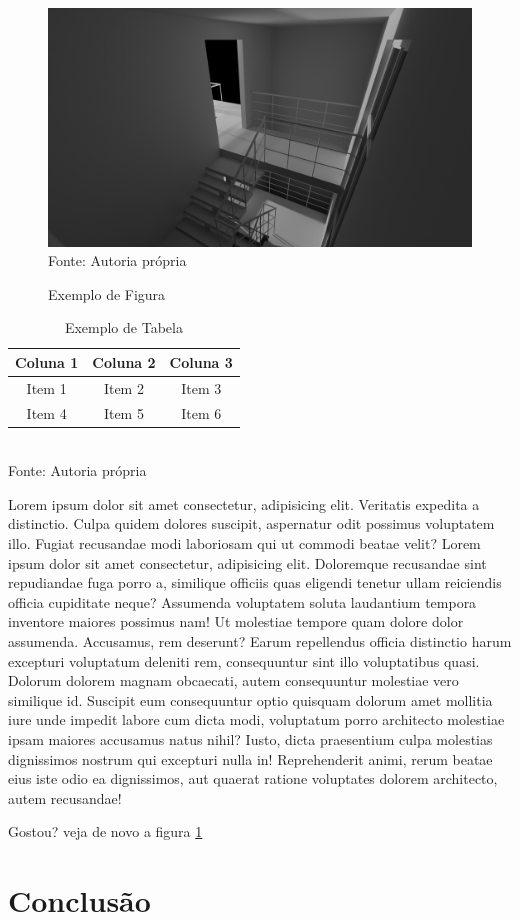 \documentclass[12pt,a4paper,oneside,brazil]{abntex2}
\begin{document}
\begin{figure}[ht]
    \centering
    \caption{Exemplo de Figura}
    \includegraphics[width=1.0\textwidth]{./src/assets/untitled.png}
    \label{fig:exemplo}
    \textnormal{\fontsize{10pt}{12pt}Fonte: Autoria própria}
\end{figure}

\begin{table}[ht]
    \centering
    \caption{Exemplo de Tabela}
    \begin{tabular}{|c|c|c|}
        \hline
        Coluna 1 & Coluna 2 & Coluna 3 \\ \hline
        Item 1   & Item 2   & Item 3   \\ \hline
        Item 4   & Item 5   & Item 6   \\ \hline
    \end{tabular}
    \label{tab:exemplo}
    \\\textnormal{\fontsize{10pt}{12pt}Fonte: Autoria própria}
\end{table}

Lorem ipsum dolor sit amet consectetur, adipisicing elit. Veritatis expedita a distinctio. Culpa quidem dolores suscipit, aspernatur odit possimus voluptatem illo. Fugiat recusandae modi laboriosam qui ut commodi beatae velit?
Lorem ipsum dolor sit amet consectetur, adipisicing elit. Doloremque recusandae sint repudiandae fuga porro a, similique officiis quas eligendi tenetur ullam reiciendis officia cupiditate neque? Assumenda voluptatem soluta laudantium tempora inventore maiores possimus nam! Ut molestiae tempore quam dolore dolor assumenda. Accusamus, rem deserunt? Earum repellendus officia distinctio harum excepturi voluptatum deleniti rem, consequuntur sint illo voluptatibus quasi. Dolorum dolorem magnam obcaecati, autem consequuntur molestiae vero similique id. Suscipit eum consequuntur optio quisquam dolorum amet mollitia iure unde impedit labore cum dicta modi, voluptatum porro architecto molestiae ipsam maiores accusamus natus nihil? Iusto, dicta praesentium culpa molestias dignissimos nostrum qui excepturi nulla in! Reprehenderit animi, rerum beatae eius iste odio ea dignissimos, aut quaerat ratione voluptates dolorem architecto, autem recusandae!

Gostou? veja de novo a figura \ref{fig:exemplo}

\chapter{Conclusão}
\lipsum[11-12]


\end{document}
